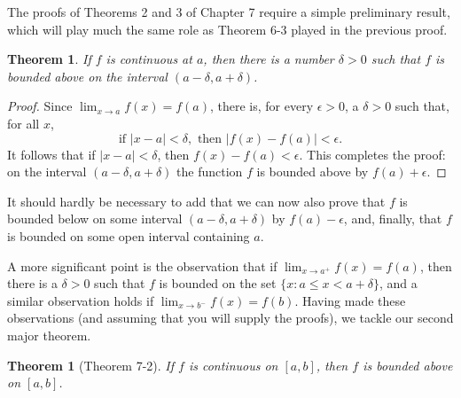 \documentclass{article}
\newtheorem{theorem}{Theorem}
\newtheorem*{theorem*}{Theorem}
\begin{document}
The proofs of Theorems 2 and 3 of Chapter 7 require a simple preliminary
result, which will play much the same role as Theorem 6-3 played in the
previous proof.

\begin{theorem}
  If $f$ is continuous at $a$, then there is a number $\delta > 0$ such that
  $f$ is bounded above on the interval $(a - \delta, a + \delta)$.
\end{theorem}

\begin{proof}
  Since $\lim_{x \rightarrow a}f(x) = f(a)$, there is, for every $\epsilon >
  0$, a $\delta > 0$ such that, for all $x$, \begin{equation*}
    \text{if } |x - a| < \delta, \text{ then } |f(x) - f(a)| < \epsilon.
  \end{equation*}
  It follows that if $|x - a| < \delta$, then $f(x) - f(a) < \epsilon$. This
  completes the proof: on the interval $(a - \delta, a + \delta)$ the function
  $f$ is bounded above by $f(a) + \epsilon$.
\end{proof}

It should hardly be necessary to add that we can now also prove that $f$ is
bounded below on some interval $(a - \delta, a + \delta)$ by $f(a) - \epsilon$,
and, finally, that $f$ is bounded on some open interval containing $a$.

A more significant point is the observation that if $\lim_{x \rightarrow a^+}
f(x) = f(a)$, then there is a $\delta > 0$ such that $f$ is bounded on the set
$\{x: a \leq x < a + \delta\}$, and a similar observation holds if $\lim_{x
\rightarrow b^-}f(x) = f(b)$. Having made these observations (and assuming that
you will supply the proofs), we tackle our second major theorem.

\begin{theorem*}[Theorem 7-2]
  If $f$ is continuous on $[a, b]$, then $f$ is bounded above on $[a, b]$.
\end{theorem*}
\end{document}
